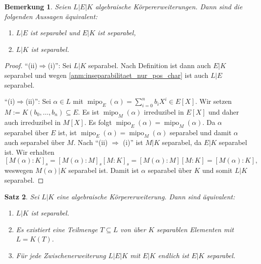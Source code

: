 \documentclass[a4paper, twoside, 11pt, ngerman]{report}
\DeclareMathOperator{\mipo}{mipo}
\theoremstyle{definistyle}
\newtheorem{satz}{Satz}[section]
\newtheorem{bem}[satz]{Bemerkung}
\theoremstyle{remark}
\begin{document}
\begin{bem}\label{bem:separabel_transitiv}
Seien $L|E|K$ algebraische Körpererweiterungen. Dann sind die folgenden Aussagen äquivalent:
\begin{enumerate}
    \item[(i)] $L|E$ ist separabel und $E|K$ ist separabel,
    \item[(ii)] $L|K$ ist separabel.
\end{enumerate}
\end{bem}
\begin{proof}
"`(ii)$\Rightarrow$(i)"': Sei $L|K$ separabel. Nach Definition ist dann auch $E|K$ separabel und wegen
\ref{anm:inseparabilitaet_nur_pos_char} ist auch $L|E$ separabel.

"`(i)$\Rightarrow$(ii)"': Sei $\alpha \in L$ mit $\mipo_E(\alpha) = \sum_{i=0}^n b_i X^i \in E[X]$. 
Wir setzen $M := K(b_0, \dots, b_n) \subseteq E$. Es ist $\mipo_M(\alpha)$ irreduzibel in $E[X]$ und 
daher auch irreduzibel in $M[X]$. Es folgt $\mipo_E(\alpha) = \mipo_M(\alpha)$. 
Da $\alpha$ separabel über $E$ ist, ist $\mipo_E(\alpha)=\mipo_M(\alpha)$ separabel und damit $\alpha$ auch separabel über $M$. Nach "`(ii) $\Rightarrow$ (i)"' ist $M|K$ separabel, da $E|K$ separabel ist. Wir erhalten
\[
[M(\alpha):K]_s=[M(\alpha):M]_s[M:K]_s=[M(\alpha):M][M:K]=[M(\alpha):K],
\]
weswegen $M(\alpha)|K$ separabel ist. Damit ist $\alpha$ separabel über $K$ und somit $L|K$ separabel.
\end{proof}

\begin{satz}\label{satz:separabel_eigenschaften}
Sei $L|K$ eine algebraische Körpererweiterung. Dann sind äquivalent:
\begin{enumerate}
    \item[(i)] $L|K$ ist separabel.
    \item[(ii)] Es existiert eine Teilmenge $T \subseteq L$ von über $K$ separablen Elementen mit $L = K(T)$.
    \item[(iii)] Für jede Zwischenerweiterung $L|E|K$ mit $E|K$ endlich ist $E|K$ separabel.
\end{enumerate}
\end{satz}
\end{document}
